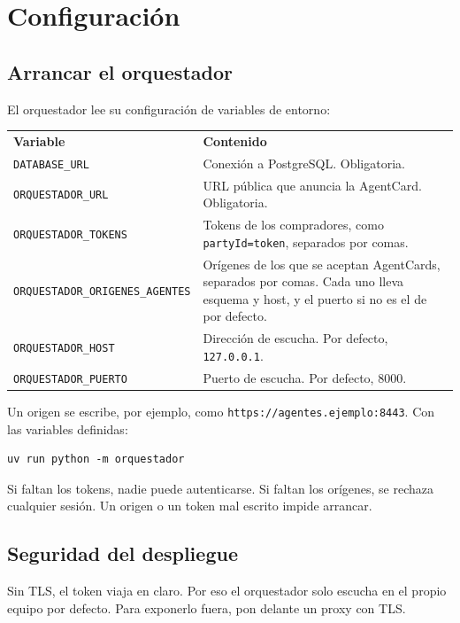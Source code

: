 \chapter{Configuración}

\section{Arrancar el orquestador}

El orquestador lee su configuración de variables de entorno:

\begin{tabular}{lp{6.5cm}}
  \textbf{Variable} & \textbf{Contenido} \\
  \texttt{DATABASE\_URL} & Conexión a PostgreSQL. Obligatoria. \\
  \texttt{ORQUESTADOR\_URL} & URL pública que anuncia la AgentCard. Obligatoria. \\
  \texttt{ORQUESTADOR\_TOKENS} & Tokens de los compradores, como \texttt{partyId=token}, separados por comas. \\
  \texttt{ORQUESTADOR\_ORIGENES\_AGENTES} & Orígenes de los que se aceptan AgentCards, separados por comas. Cada uno lleva esquema y host, y el puerto si no es el de por defecto. \\
  \texttt{ORQUESTADOR\_HOST} & Dirección de escucha. Por defecto, \texttt{127.0.0.1}. \\
  \texttt{ORQUESTADOR\_PUERTO} & Puerto de escucha. Por defecto, 8000. \\
\end{tabular}

Un origen se escribe, por ejemplo, como \texttt{https://agentes.ejemplo:8443}. Con las variables definidas:

\begin{verbatim}
uv run python -m orquestador
\end{verbatim}

Si faltan los tokens, nadie puede autenticarse. Si faltan los orígenes, se rechaza cualquier sesión. Un origen o un token mal escrito impide arrancar.

\section{Seguridad del despliegue}

Sin TLS, el token viaja en claro. Por eso el orquestador solo escucha en el propio equipo por defecto. Para exponerlo fuera, pon delante un proxy con TLS.


